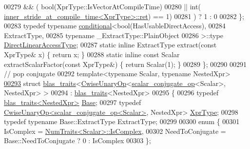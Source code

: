 \begin{DoxyCode}
00279                               && (   \textcolor{keywordtype}{bool}(XprType::IsVectorAtCompileTime)
00280                                   || int(
      \hyperlink{struct_eigen_1_1internal_1_1inner__stride__at__compile__time}{inner\_stride\_at\_compile\_time<XprType>::ret}) == 1)
00281                              ) ?  1 : 0
00282   \};
00283   \textcolor{keyword}{typedef} \textcolor{keyword}{typename} \hyperlink{struct_eigen_1_1internal_1_1conditional}{conditional}<bool(HasUsableDirectAccess),
00284     ExtractType,
00285     \textcolor{keyword}{typename} \_ExtractType::PlainObject
00286     >::type \hyperlink{class_eigen_1_1internal_1_1_tensor_lazy_evaluator_writable}{DirectLinearAccessType};
00287   \textcolor{keyword}{static} \textcolor{keyword}{inline} ExtractType extract(\textcolor{keyword}{const} XprType& x) \{ \textcolor{keywordflow}{return} x; \}
00288   \textcolor{keyword}{static} \textcolor{keyword}{inline} \textcolor{keyword}{const} Scalar extractScalarFactor(\textcolor{keyword}{const} XprType&) \{ \textcolor{keywordflow}{return} Scalar(1); \}
00289 \};
00290 
00291 \textcolor{comment}{// pop conjugate}
00292 \textcolor{keyword}{template}<\textcolor{keyword}{typename} Scalar, \textcolor{keyword}{typename} NestedXpr>
\hyperlink{struct_eigen_1_1internal_1_1blas__traits_3_01_cwise_unary_op_3_01scalar__conjugate__op_3_01_scal305db6e51b207e2ce8fc6ea06996a706}{00293} \textcolor{keyword}{struct }\hyperlink{struct_eigen_1_1internal_1_1blas__traits}{blas\_traits}<\hyperlink{group___core___module_class_eigen_1_1_cwise_unary_op}{CwiseUnaryOp}<\hyperlink{struct_eigen_1_1internal_1_1scalar__conjugate__op}{scalar\_conjugate\_op}<Scalar>, 
      NestedXpr> >
00294  : \hyperlink{struct_eigen_1_1internal_1_1blas__traits}{blas\_traits}<NestedXpr>
00295 \{
00296   \textcolor{keyword}{typedef} \hyperlink{struct_eigen_1_1internal_1_1blas__traits}{blas\_traits<NestedXpr>} \hyperlink{struct_eigen_1_1internal_1_1blas__traits}{Base};
00297   \textcolor{keyword}{typedef} \hyperlink{group___core___module_class_eigen_1_1_cwise_unary_op}{CwiseUnaryOp<scalar\_conjugate\_op<Scalar>}, NestedXpr> 
      \hyperlink{group___core___module_class_eigen_1_1_cwise_unary_op}{XprType};
00298   \textcolor{keyword}{typedef} \textcolor{keyword}{typename} Base::ExtractType ExtractType;
00299 
00300   \textcolor{keyword}{enum} \{
00301     IsComplex = \hyperlink{group___core___module_struct_eigen_1_1_num_traits}{NumTraits<Scalar>::IsComplex},
00302     NeedToConjugate = Base::NeedToConjugate ? 0 : IsComplex
00303   \};

\end{DoxyCode}
